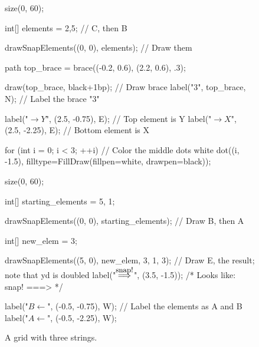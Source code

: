 \documentclass[../gatm.tex]{subfiles}
\begin{document}
\begin{figure}[h]
	\begin{minipage}{.5\textwidth}
		\begin{center}
			\begin{asy}
				size(0, 60);

				int[] elements = {2,5}; // C, then B

				drawSnapElements((0, 0), elements); // Draw them
				
				path top_brace = brace((-0.2, 0.6), (2.2, 0.6), .3);

				draw(top_brace, black+1bp); // Draw brace 
				label("$3$", top_brace, N); // Label the brace "3"

				label("$\rightarrow Y$", (2.5, -0.75), E); // Top element is Y
				label("$\rightarrow X$", (2.5, -2.25), E); // Bottom element is X

				for (int i = 0; i < 3; ++i) // Color the middle dots white
					dot((i, -1.5), filltype=FillDraw(fillpen=white, drawpen=black));
			\end{asy}

			\caption{A grid with three strings.}
			\label{fig:n_rows_3_cols_ex}
		\end{center}
	\end{minipage}%
	\begin{minipage}{.5\textwidth}
		\begin{center}
			\begin{asy}
				size(0, 60);

				int[] starting_elements = {5, 1};

				drawSnapElements((0, 0), starting_elements); // Draw B, then A

				int[] new_elem = {3};

				drawSnapElements((5, 0), new_elem, 3, 1, 3); // Draw E, the result; note that yd is doubled
				label("$\stackrel{\mbox{\small snap!}}{\Longrightarrow}$", (3.5, -1.5));
				/* Looks like:
					  snap!
					  ===>  */

				label("$B \leftarrow$", (-0.5, -0.75), W); // Label the elements as A and B
				label("$A \leftarrow$", (-0.5, -2.25), W);


\end{asy}
\end{center}
\end{minipage}
\end{figure}
\end{document}
